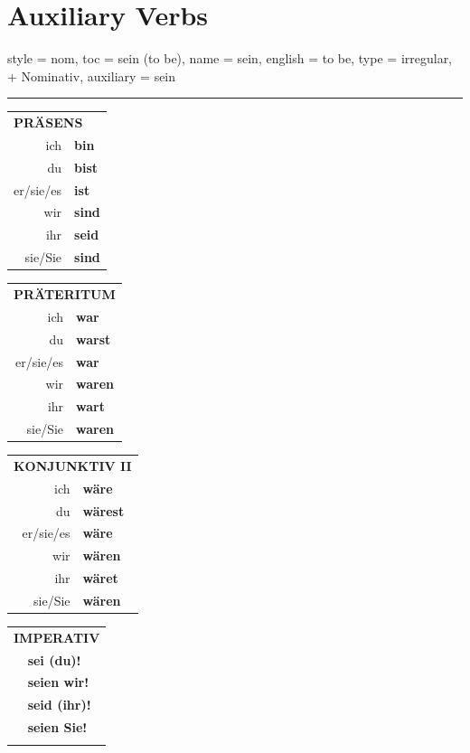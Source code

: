 \chapter{Auxiliary Verbs}

\begin{verbentry}{
  style = {nom},
  toc = {sein (to be)},
  name = {sein},
  english = {to be},
  type = {irregular, + Nominativ},
  auxiliary = {sein}
}
 
     \vspace{5pt}
    \hrule
    \vspace{5pt}
  \begin{tabular}{rl}
     \multicolumn{2}{l}{\textbf{PRÄSENS}}\\
    ich & \textbf{bin}\\
    du & \textbf{bist}\\
    er/sie/es & \textbf{ist}\\
    wir & \textbf{sind}\\
    ihr & \textbf{seid}\\
    sie/Sie & \textbf{sind}\\
  \end{tabular}
  \hfill
     \begin{tabular}{rl}
    \multicolumn{2}{l}{\textbf{PRÄTERITUM}}\\
    ich & \textbf{war}\\
    du & \textbf{warst}\\
    er/sie/es & \textbf{war}\\
    wir & \textbf{waren}\\
    ihr & \textbf{wart}\\
    sie/Sie & \textbf{waren}\\
  \end{tabular}
    \hfill
     \begin{tabular}{rl}
    \multicolumn{2}{l}{\textbf{KONJUNKTIV II}}\\
    ich & \textbf{wäre}\\
    du & \textbf{wärest}\\
    er/sie/es & \textbf{wäre}\\
    wir & \textbf{wären}\\
    ihr & \textbf{wäret}\\
    sie/Sie & \textbf{wären}\\
  \end{tabular}
  \hfill
  \begin{tabular}{rl}
     \multicolumn{2}{l}{\textbf{IMPERATIV}}\\
   & \textbf{sei (du)!}\\
   & \textbf{seien wir!}\\
   & \textbf{seid (ihr)!}\\
   & \textbf{seien Sie!}\\
   & \vspace{10pt}
  \end{tabular}


\end{verbentry}

